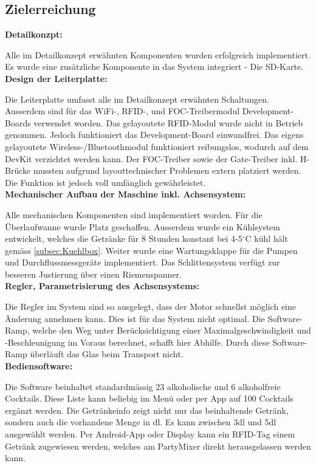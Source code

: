 \subsection{Zielerreichung}
\label{subsec:Zielerreichung}


\textbf{Detailkonzpt:}

Alle im Detailkonzept erwähnten Komponenten wurden erfolgreich implementiert. Es wurde eine zusätzliche Komponente in das System integriert - Die SD-Karte.\\

\textbf{Design der Leiterplatte:} 

Die Leiterplatte umfasst alle im Detailkonzept erwähnten Schaltungen. Ausserdem sind für das WiFi-, RFID-, und FOC-Treibermodul Development-Boards verwendet worden. Das gelayoutete RFID-Modul wurde nicht in Betrieb genommen. Jedoch funktioniert das Development-Board einwandfrei. Das eigens gelayoutete Wireless-/Bluetoothmodul funktioniert reibungslos, wodurch auf dem DevKit verzichtet werden kann. Der FOC-Treiber sowie der Gate-Treiber inkl. H-Brücke mussten aufgrund layouttechnischer Problemen extern platziert werden. Die Funktion ist jedoch voll umfänglich gewährleistet.\\

\textbf{Mechanischer Aufbau der Maschine inkl. Achsensystem:}

Alle mechanischen Komponenten sind implementiert worden. Für die Überlaufwanne wurde Platz geschaffen. Ausserdem wurde ein Kühlsystem entwickelt, welches die Getränke für 8 Stunden konstant bei 4-5$^\circ$C kühl hält gemäss \ref{subsec:Kuehlbox}. Weiter wurde eine Wartungsklappe für die Pumpen und Durchflussmessgeräte implementiert. Das Schlittensystem verfügt zur besseren Justierung über einen Riemenspanner.\\

\textbf{Regler, Parametrisierung des Achsensystems:}

Die Regler im System sind so ausgelegt, dass der Motor schnellst möglich eine Änderung annehmen kann. Dies ist für das System nicht optimal. Die Software-Ramp, welche den Weg unter Berücksichtigung einer Maximalgeschwindigkeit und -Beschleunigung im Voraus berechnet, schafft hier Abhilfe. Durch diese Software-Ramp überläuft das Glas beim Transport nicht.\\

\textbf{Bediensoftware:}

Die Software beinhaltet standardmässig 23 alkoholische und 6 alkoholfreie Cocktails. Diese Liste kann beliebig im Menü oder per App auf 100 Cocktails ergänzt werden. Die Getränkeinfo zeigt nicht nur das beinhaltende Getränk, sondern auch die vorhandene Menge in dl. Es kann zwischen 3dl und 5dl ausgewählt werden. Per Android-App oder Display kann ein RFID-Tag einem Getränk zugewiesen werden, welches am PartyMixer direkt herausgelassen werden kann.\\

